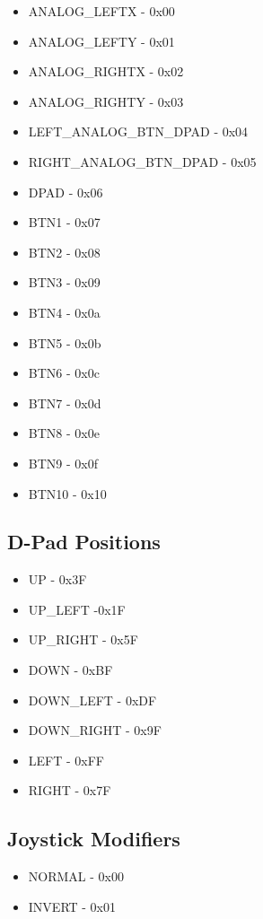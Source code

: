 \documentclass[11pt]{article} %
\begin{document}
\begin{itemize}
\item ANALOG\_LEFTX - 0x00
\item ANALOG\_LEFTY - 0x01
\item ANALOG\_RIGHTX - 0x02
\item ANALOG\_RIGHTY - 0x03
\item LEFT\_ANALOG\_BTN\_DPAD - 0x04
\item RIGHT\_ANALOG\_BTN\_DPAD - 0x05
\item DPAD - 0x06
\item BTN1 - 0x07
\item BTN2 - 0x08
\item BTN3 - 0x09
\item BTN4 - 0x0a
\item BTN5 - 0x0b
\item BTN6 - 0x0c
\item BTN7 - 0x0d
\item BTN8 - 0x0e
\item BTN9 - 0x0f
\item BTN10 - 0x10
\end{itemize}

\newpage

\subsection{D-Pad Positions}

\begin{itemize}
\item UP - 0x3F
\item UP\_LEFT -0x1F
\item UP\_RIGHT - 0x5F
\item DOWN - 0xBF
\item DOWN\_LEFT - 0xDF
\item DOWN\_RIGHT - 0x9F
\item LEFT - 0xFF
\item RIGHT - 0x7F
\end{itemize}

\subsection{Joystick Modifiers}

\begin{itemize}
\item NORMAL - 0x00
\item INVERT - 0x01
\end{itemize}
\end{document}

